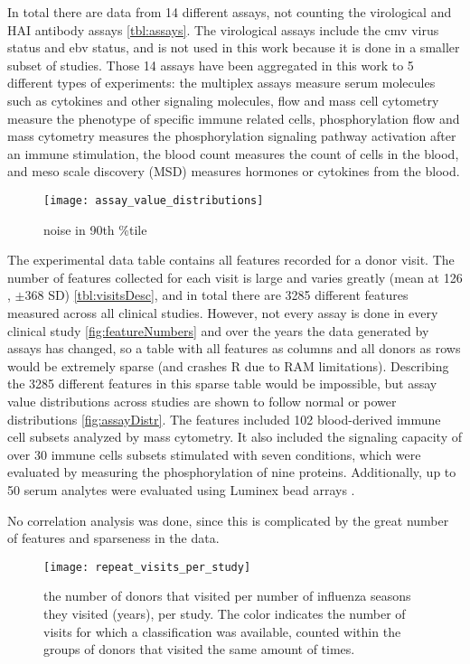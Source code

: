In total there are data from 14 different assays, not counting the virological
and HAI antibody assays \autoref{tbl:assays}. The virological assays include
the cmv virus status and ebv status, and is not used in this work because it is
done in a smaller subset of studies. Those 14 assays have been aggregated in
this work to 5 different types of experiments: the multiplex assays measure
serum molecules such as cytokines and other signaling molecules, flow and mass
cell cytometry measure the phenotype of specific immune related cells,
phosphorylation flow and mass cytometry measures the phosphorylation signaling
pathway activation after an immune stimulation, the blood count measures the
count of cells in the blood, and meso scale discovery (MSD) measures hormones
or cytokines from the blood.

\begin{figure}
    \texttt{[image: assay\_value\_distributions]}
    \caption{noise in 90th \%tile}\label{fig:assayDistr}
\end{figure}

The experimental data table contains all features recorded for a donor visit.
The number of features collected for each visit is large and varies greatly
(mean at 126 , \(\pm \)368 SD) \autoref{tbl:visitsDesc}, and in total there are
3285 different features measured across all clinical studies. However, not
every assay is done in every clinical study \autoref{fig:featureNumbers} and
over the years the data generated by assays has changed, so a table with all
features as columns and all donors as rows would be extremely sparse (and
crashes R due to RAM limitations).  Describing the 3285 different features in
this sparse table would be impossible, but assay value distributions across
studies are shown to follow normal or power distributions
\autoref{fig:assayDistr}. The features included 102 blood-derived immune cell
subsets analyzed by mass cytometry. It also included the signaling capacity of
over 30 immune cells subsets stimulated with seven conditions, which were
evaluated by measuring the phosphorylation of nine proteins. Additionally, up
to 50 serum analytes were evaluated using Luminex bead arrays
\citep{tomicSIMONAutomatedMachine2019}.

No correlation analysis was done, since this is complicated by the great number
of features and sparseness in the data.

\begin{figure}
    \texttt{[image: repeat\_visits\_per\_study]}
    \caption{the number of donors that visited per number of influenza seasons
    they visited (years), per study. The color indicates the number of visits for which a
    classification was available, counted within the groups of donors that
    visited the same amount of times.}\label{fig:repeatVisits}
\end{figure}

